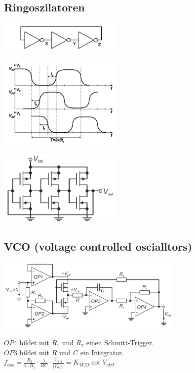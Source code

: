\subsection{Ringoszilatoren}
	\begin{multicols}{3}
	 	\includegraphics[width=6cm]{bilder/osziRing.png}	
		\columnbreak
		
		\includegraphics[width=6cm]{bilder/osziRingSignal.png}	
		\columnbreak
		
		\includegraphics[width=6cm]{bilder/osziRingCMOS.png}
	\end{multicols}
\subsection{VCO (voltage controlled oscialltors)}
	\begin{multicols}{2}
		\includegraphics[width=9cm]{bilder/osciVCO.png}
		\columnbreak
		
		$OP4$ bildet mit $R_1$ und $R_2$ einen Schmitt-Trigger.\\
		$OP3$ bildet mit $R$ und $C$ ein Integrator.\\
		$f_{osc}=\frac{R_2}{4\cdot R_1}\cdot \frac{1}{RC}\cdot
		\frac{V_{ctrl}}{\left|V_{out}\right|}=K_{VCO}\cot V_{ctrl}$\\
	\end{multicols}
